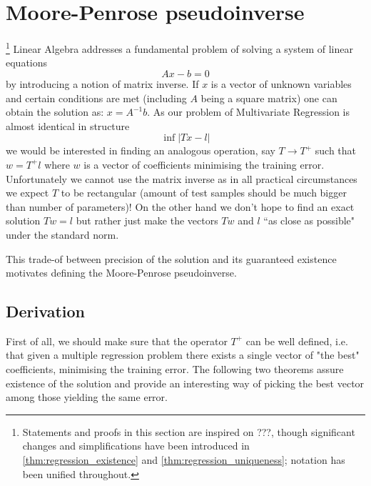 \documentclass[a4paper]{article}
\theoremstyle{break}
\newcommand{\bib}{???}
\begin{document}
\section{Moore-Penrose pseudoinverse}
\footnote{Statements and proofs in this section are inspired on \bib, though significant changes and simplifications have been introduced in \ref{thm:regression_existence} and \ref{thm:regression_uniqueness}; notation has been unified throughout.}
Linear Algebra addresses a fundamental problem of solving a system of linear equations
$$ A x - b = 0$$
by introducing a notion of matrix inverse. If $x$ is a vector of unknown variables and certain conditions are met (including $A$ being a square matrix) one can obtain the solution as: $ x = A^{-1} b $. As our problem of Multivariate Regression is almost identical in structure
$$ \inf | T x - l | $$
we would be interested in finding an analogous operation, say $ T \to T^+$ such that $ w = T^+ l$ where $w$ is a vector of coefficients minimising the training error. Unfortunately we cannot use the matrix inverse as in all practical circumstances we expect $T$ to be rectangular (amount of test samples should be much bigger than number of parameters)! On the other hand we don't hope to find an exact solution $ T w = l$ but rather just make the vectors $T w$ and $l$ ``as close as possible" under the standard norm.

This trade-of between precision of the solution and its guaranteed existence motivates defining the Moore-Penrose pseudoinverse.

\subsection{Derivation}
First of all, we should make sure that the operator $T^+$ can be well defined, i.e. that given a multiple regression problem there exists a single vector of "the best" coefficients, minimising the training error.
The following two theorems assure existence of the solution and provide an interesting way of picking the best vector among those yielding the same error.
\end{document}
